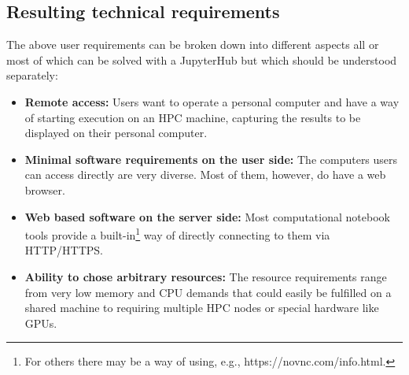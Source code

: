 \subsection{Resulting technical requirements}


The above user requirements can be broken down into different aspects all or most of which can be solved with a JupyterHub but which should be understood separately:
\begin{itemize}
  \item \textbf{Remote access:}  Users want to operate a personal computer and have a way of starting execution on an HPC machine, capturing the results to be displayed on their personal computer.
  \item \textbf{Minimal software requirements on the user side:}  The computers users can access directly are very diverse.  Most of them, however, do have a web browser.
  \item \textbf{Web based software on the server side:}  Most computational notebook tools provide a built-in\footnote{For others there may be a way of using, e.g., https://novnc.com/info.html.} way of directly connecting to them via HTTP/HTTPS.
  \item \textbf{Ability to chose arbitrary resources:}  The resource requirements range from very low memory and CPU demands that could easily be fulfilled on a shared machine to requiring multiple HPC nodes or special hardware like GPUs.
\end{itemize}


